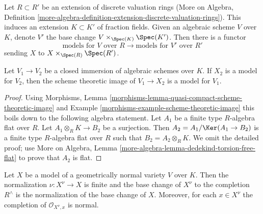 \medskip\noindent
Let $R \subset R'$ be an extension of discrete valuation rings
(More on Algebra, Definition
\ref{more-algebra-definition-extension-discrete-valuation-rings}).
This induces an extension $K \subset K'$ of fraction fields.
Given an algebraic scheme $V$ over $K$, denote $V'$ the
base change $V \times_{\Spec(K)} \Spec(K')$. Then there is
a functor
$$
\text{models for }V\text{ over }R
\longrightarrow
\text{models for }V'\text{ over }R'
$$
sending $X$ to $X \times_{\Spec(R)} \Spec(R')$.

\begin{lemma}
\label{lemma-closure-is-model}
Let $V_1 \to V_2$ be a closed immersion of algebraic schemes over $K$.
If $X_2$ is a model for $V_2$, then the scheme theoretic image
of $V_1 \to X_2$ is a model for $V_1$.
\end{lemma}

\begin{proof}
Using
Morphisms, Lemma \ref{morphisms-lemma-quasi-compact-scheme-theoretic-image} and
Example \ref{morphisms-example-scheme-theoretic-image}
this boils down to the following algebra statement.
Let $A_1$ be a finite type $R$-algebra flat over $R$.
Let $A_1 \otimes_R K \to B_2$ be a surjection. Then
$A_2 = A_1 / \Ker(A_1 \to B_2)$ is a finite type $R$-algebra
flat over $R$ such that $B_2 = A_2 \otimes_R K$.
We omit the detailed proof; use
More on Algebra, Lemma \ref{more-algebra-lemma-dedekind-torsion-free-flat}
to prove that $A_2$ is flat.
\end{proof}

\begin{lemma}
\label{lemma-normalization}
Let $X$ be a model of a geometrically normal variety $V$ over $K$.
Then the normalization $\nu : X^\nu \to X$ is finite and
the base change of $X^\nu$ to the completion $R^\wedge$
is the normalization of the base change of $X$. Moreover, for
each $x \in X^\nu$ the completion of $\mathcal{O}_{X^\nu, x}$
is normal.
\end{lemma}

